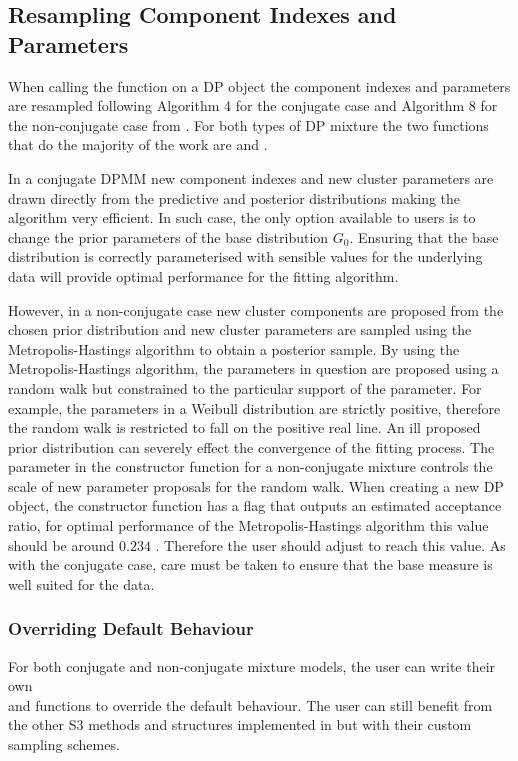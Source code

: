 \documentclass[nojss]{jss}
\begin{document}
\subsection{Resampling Component Indexes and Parameters}
When calling the  function on a DP object the component indexes and parameters are resampled following Algorithm 4 for the conjugate case and Algorithm 8 for the non-conjugate case from \cite{neal_markov_2000}. For both types of DP mixture the two functions that do the majority of the work are  and .

In a conjugate DPMM new component indexes and new cluster parameters are drawn directly from the predictive and posterior distributions making the algorithm very efficient. In such case, the only option available to users is to change the prior parameters of the base distribution $G_0$. Ensuring that the base distribution is correctly parameterised with sensible values for the underlying data will provide optimal performance for the fitting algorithm.

However, in a non-conjugate case new cluster components are proposed from the chosen prior distribution and new cluster parameters are sampled using the Metropolis-Hastings algorithm to obtain a posterior sample. By using the Metropolis-Hastings algorithm, the parameters in question are proposed using a random walk but constrained to the particular support of the parameter. For example, the parameters in a Weibull distribution are strictly positive, therefore the random walk is restricted to fall on the positive real line. An ill proposed prior distribution can severely effect the convergence of the fitting process. The parameter  in the constructor function for a non-conjugate mixture controls the scale of new parameter proposals for the random walk. When creating a new DP object, the constructor function has a flag  that outputs an estimated acceptance ratio, for optimal performance of the Metropolis-Hastings algorithm this value should be around $0.234$ \citep{gelman_efficient_1996}. Therefore the user should adjust  to reach this value. As with the conjugate case, care must be taken to ensure that the base measure is well suited for the data.

\subsubsection{Overriding Default Behaviour}
For both conjugate and non-conjugate mixture models, the user can write their own \\  and  functions to override the default behaviour. The user can still benefit from the other S3 methods and structures implemented in  but with their custom sampling schemes.
\end{document}
